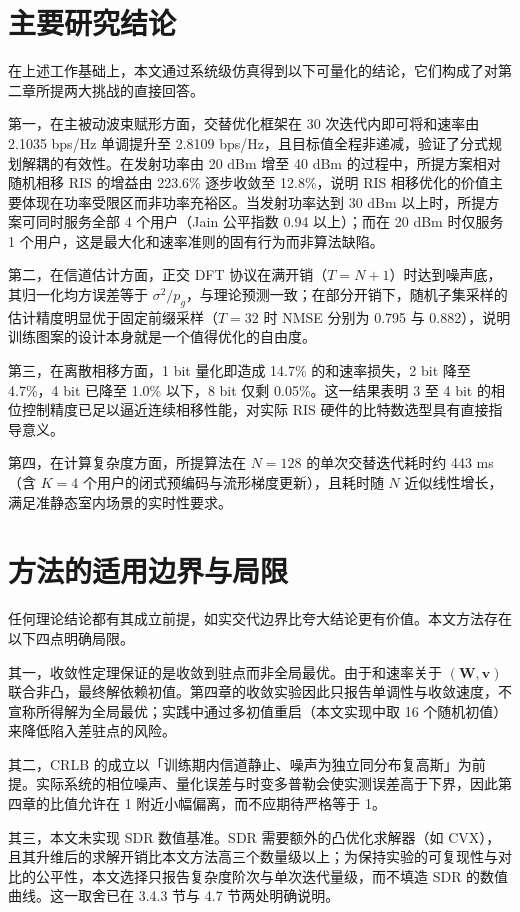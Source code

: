 \section{主要研究结论}

在上述工作基础上，本文通过系统级仿真得到以下可量化的结论，它们构成了对第二章所提两大挑战的直接回答。

第一，在主被动波束赋形方面，交替优化框架在 30 次迭代内即可将和速率由 2.1035 bps/Hz 单调提升至 2.8109 bps/Hz，且目标值全程非递减，验证了分式规划解耦的有效性。在发射功率由 20 dBm 增至 40 dBm 的过程中，所提方案相对随机相移 RIS 的增益由 223.6\% 逐步收敛至 12.8\%，说明 RIS 相移优化的价值主要体现在功率受限区而非功率充裕区。当发射功率达到 30 dBm 以上时，所提方案可同时服务全部 4 个用户（Jain 公平指数 0.94 以上）；而在 20 dBm 时仅服务 1 个用户，这是最大化和速率准则的固有行为而非算法缺陷。

第二，在信道估计方面，正交 DFT 协议在满开销（$T = N+1$）时达到噪声底，其归一化均方误差等于 $\sigma^2/p_g$，与理论预测一致；在部分开销下，随机子集采样的估计精度明显优于固定前缀采样（$T = 32$ 时 NMSE 分别为 0.795 与 0.882），说明训练图案的设计本身就是一个值得优化的自由度。

第三，在离散相移方面，1 bit 量化即造成 14.7\% 的和速率损失，2 bit 降至 4.7\%，4 bit 已降至 1.0\% 以下，8 bit 仅剩 0.05\%。这一结果表明 3 至 4 bit 的相位控制精度已足以逼近连续相移性能，对实际 RIS 硬件的比特数选型具有直接指导意义。

第四，在计算复杂度方面，所提算法在 $N = 128$ 的单次交替迭代耗时约 443 ms（含 $K = 4$ 个用户的闭式预编码与流形梯度更新），且耗时随 $N$ 近似线性增长，满足准静态室内场景的实时性要求。

\section{方法的适用边界与局限}

任何理论结论都有其成立前提，如实交代边界比夸大结论更有价值。本文方法存在以下四点明确局限。

其一，收敛性定理保证的是收敛到驻点而非全局最优。由于和速率关于 $(\bm{W}, \bm{v})$ 联合非凸，最终解依赖初值。第四章的收敛实验因此只报告单调性与收敛速度，不宣称所得解为全局最优；实践中通过多初值重启（本文实现中取 16 个随机初值）来降低陷入差驻点的风险。

其二，CRLB 的成立以「训练期内信道静止、噪声为独立同分布复高斯」为前提。实际系统的相位噪声、量化误差与时变多普勒会使实测误差高于下界，因此第四章的比值允许在 1 附近小幅偏离，而不应期待严格等于 1。

其三，本文未实现 SDR 数值基准。SDR 需要额外的凸优化求解器（如 CVX），且其升维后的求解开销比本文方法高三个数量级以上；为保持实验的可复现性与对比的公平性，本文选择只报告复杂度阶次与单次迭代量级，而不填造 SDR 的数值曲线。这一取舍已在 3.4.3 节与 4.7 节两处明确说明。

